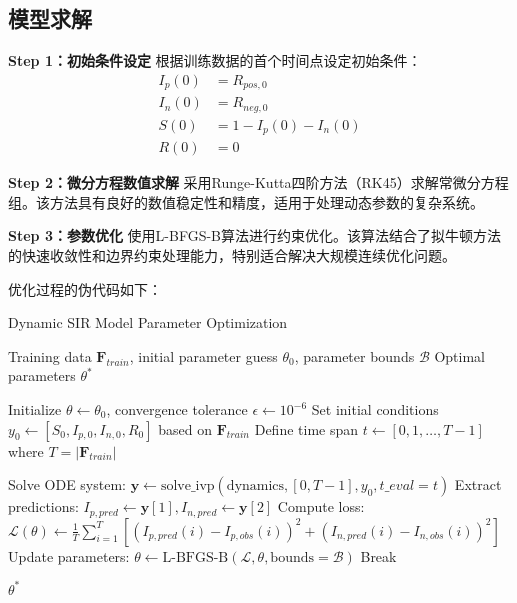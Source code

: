 \documentclass[withoutpreface,bwprint]{cumcmthesis}
\begin{document}
\subsection{模型求解}

\textbf{Step 1：初始条件设定}
根据训练数据的首个时间点设定初始条件：
\begin{equation}
\label{eq:initial_conditions}
\begin{aligned}
I_p(0) &= R_{pos,0} \\
I_n(0) &= R_{neg,0} \\
S(0) &= 1 - I_p(0) - I_n(0) \\
R(0) &= 0
\end{aligned}
\end{equation}

\textbf{Step 2：微分方程数值求解}
采用Runge-Kutta四阶方法（RK45）求解常微分方程组。该方法具有良好的数值稳定性和精度，适用于处理动态参数的复杂系统。

\textbf{Step 3：参数优化}
使用L-BFGS-B算法进行约束优化。该算法结合了拟牛顿方法的快速收敛性和边界约束处理能力，特别适合解决大规模连续优化问题。

优化过程的伪代码如下：
\begin{algorithm}[H]
\caption{Dynamic SIR Model Parameter Optimization}
\begin{algorithmic}[1]
\Require Training data $\mathbf{F}_{train}$, initial parameter guess $\theta_0$, parameter bounds $\mathcal{B}$
\Ensure Optimal parameters $\theta^*$

\State Initialize $\theta \leftarrow \theta_0$, convergence tolerance $\epsilon \leftarrow 10^{-6}$
\State Set initial conditions $y_0 \leftarrow [S_0, I_{p,0}, I_{n,0}, R_0]$ based on $\mathbf{F}_{train}$
\State Define time span $t \leftarrow [0, 1, \ldots, T-1]$ where $T = |\mathbf{F}_{train}|$

    \State Solve ODE system: $\mathbf{y} \leftarrow \text{solve\_ivp}(\text{dynamics}, [0, T-1], y_0, t\_eval=t)$
    \State Extract predictions: $I_{p,pred} \leftarrow \mathbf{y}[1], I_{n,pred} \leftarrow \mathbf{y}[2]$
    \State Compute loss: $\mathcal{L}(\theta) \leftarrow \frac{1}{T}\sum_{i=1}^{T}[(I_{p,pred}(i) - I_{p,obs}(i))^2 + (I_{n,pred}(i) - I_{n,obs}(i))^2]$
    \State Update parameters: $\theta \leftarrow \text{L-BFGS-B}(\mathcal{L}, \theta, \text{bounds}=\mathcal{B})$
        \State Break 
    \EndIf
\EndWhile

\State \Return $\theta^*$
\end{algorithmic}
\end{algorithm}
\end{document}

